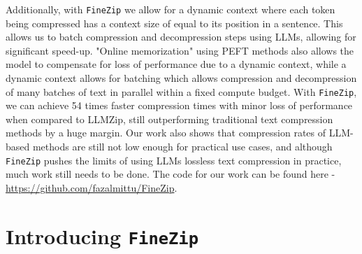 \documentclass[11pt]{article}
\begin{document}
Additionally, with \texttt{FineZip} we allow for a dynamic context where each token being compressed has a context size of equal to its position in a sentence. This allows us to batch compression and decompression steps using LLMs, allowing for significant speed-up. "Online memorization" using PEFT methods also allows the model to compensate for loss of performance due to a dynamic context, while a dynamic context allows for batching which allows compression and decompression of many batches of text in parallel within a fixed compute budget. With \texttt{FineZip}, we can achieve 54 times faster compression times with minor loss of performance when compared to LLMZip, still outperforming traditional text compression methods by a huge margin. Our work also shows that compression rates of LLM-based methods are still not low enough for practical use cases, and although \texttt{FineZip} pushes the limits of using LLMs lossless text compression in practice, much work still needs to be done. The code for our work can be found here - \url{https://github.com/fazalmittu/FineZip}.






\section{Introducing \texttt{FineZip}}
\end{document}
